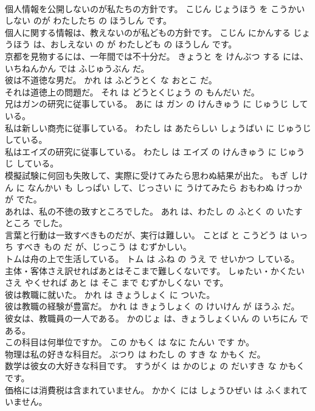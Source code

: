 \documentclass[8pt]{extreport}
\begin{document}
\begin{CJK}{UTF8}{min}
\\	個人情報を公開しないのが私たちの方針です。	こじん じょうほう を こうかい しない のが わたしたち の ほうしん です。	
\\	個人に関する情報は、教えないのが私どもの方針です。	こじん にかんする じょうほう は、おしえない の が わたしども の ほうしん です。	
\\	京都を見物するには、一年間では不十分だ。	きょうと を けんぶつ する には、いちねんかん では ふじゅうぶん だ。	
\\	彼は不道徳な男だ。	かれ は ふどうとく な おとこ だ。	
\\	それは道徳上の問題だ。	それ は どうとくじょう の もんだい だ。	
\\	兄はガンの研究に従事している。	あに は ガン の けんきゅう に じゅうじ している。	
\\	私は新しい商売に従事している。	わたし は あたらしい しょうばい に じゅうじ している。	
\\	私はエイズの研究に従事している。	わたし は エイズ の けんきゅう に じゅうじ している。	
\\	模擬試験に何回も失敗して、実際に受けてみたら思わぬ結果が出た。	もぎ しけん に なんかい も しっぱい して、じっさい に うけてみたら おもわぬ けっか が でた。	
\\	あれは、私の不徳の致すところでした。	あれ は、わたし の ふとく の いたす ところ でした。	
\\	言葉と行動は一致すべきものだが、実行は難しい。	ことば と こうどう は いっち すべき もの だ が、じっこう は むずかしい。	
\\	トムは舟の上で生活している。	トム は ふね の うえ で せいかつ している。	
\\	主体・客体さえ訳せればあとはそこまで難しくないです。	しゅたい・かくたい さえ やくせれば あと は そこ まで むずかしくない です。	
\\	彼は教職に就いた。	かれ は きょうしょく に ついた。	
\\	彼は教職の経験が豊富だ。	かれ は きょうしょく の けいけん が ほうふ だ。	
\\	彼女は、教職員の一人である。	かのじょ は、きょうしょくいん の いちにん で ある。	
\\	この科目は何単位ですか。	この かもく は なに たんい です か。	
\\	物理は私の好きな科目だ。	ぶつり は わたし の すき な かもく だ。	
\\	数学は彼女の大好きな科目です。	すうがく は かのじょ の だいすき な かもく です。	
\\	価格には消費税は含まれていません。	かかく には しょうひぜい は ふくまれていません。	

\end{CJK}
\end{document}
